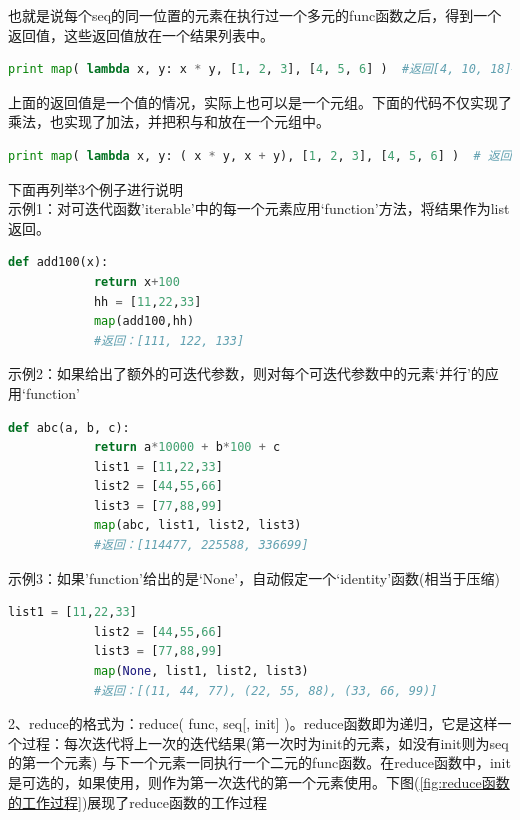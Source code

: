             也就是说每个seq的同一位置的元素在执行过一个多元的func函数之后，得到一个返回值，这些返回值放在一个结果列表中。
            \begin{lstlisting}[language=Python]
            print map( lambda x, y: x * y, [1, 2, 3], [4, 5, 6] )  #返回[4, 10, 18]#求两个列表对应元素的积
            \end{lstlisting}
            \par
            上面的返回值是一个值的情况，实际上也可以是一个元组。下面的代码不仅实现了乘法，也实现了加法，并把积与和放在一个元组中。
                \begin{lstlisting}[language=Python]
            print map( lambda x, y: ( x * y, x + y), [1, 2, 3], [4, 5, 6] )  # 返回[(4, 5), (10, 7), (18, 9)]
                \end{lstlisting}
            \par
            下面再列举3个例子进行说明\\
            示例1：对可迭代函数'iterable'中的每一个元素应用‘function’方法，将结果作为list返回。
                \begin{lstlisting}[language=Python]
            def add100(x):
            return x+100
            hh = [11,22,33]
            map(add100,hh)
            #返回：[111, 122, 133]
                \end{lstlisting}
            示例2：如果给出了额外的可迭代参数，则对每个可迭代参数中的元素‘并行’的应用‘function’
                \begin{lstlisting}[language=Python]
            def abc(a, b, c):
            return a*10000 + b*100 + c
            list1 = [11,22,33]
            list2 = [44,55,66]
            list3 = [77,88,99]
            map(abc, list1, list2, list3)
            #返回：[114477, 225588, 336699]
                \end{lstlisting}
            示例3：如果'function'给出的是‘None’，自动假定一个‘identity’函数(相当于压缩)
                \begin{lstlisting}[language=Python]
            list1 = [11,22,33]
            list2 = [44,55,66]
            list3 = [77,88,99]
            map(None, list1, list2, list3)
            #返回：[(11, 44, 77), (22, 55, 88), (33, 66, 99)]
                \end{lstlisting}
            \par
            2、reduce的格式为：reduce( func, seq[, init] )。reduce函数即为递归，它是这样一个过程：每次迭代将上一次的迭代结果(第一次时为init的元素，如没有init则为seq的第一个元素) 与下一个元素一同执行一个二元的func函数。在reduce函数中，init是可选的，如果使用，则作为第一次迭代的第一个元素使用。下图(\ref{fig:reduce函数的工作过程})展现了reduce函数的工作过程
